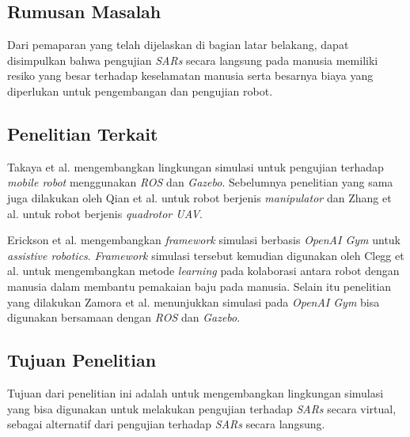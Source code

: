 \subsection{Rumusan Masalah}

Dari pemaparan yang telah dijelaskan di bagian latar belakang, dapat disimpulkan bahwa pengujian \emph{SARs} secara langsung pada manusia memiliki resiko yang besar terhadap keselamatan manusia serta besarnya biaya yang diperlukan untuk pengembangan dan pengujian robot.

\subsection{Penelitian Terkait}

Takaya et al. \citep{Takaya2016} mengembangkan lingkungan simulasi untuk pengujian terhadap \emph{mobile robot} menggunakan \emph{ROS} dan \emph{Gazebo}.
Sebelumnya penelitian yang sama juga dilakukan oleh Qian et al. \citep{Qian2014} untuk robot berjenis \emph{manipulator} dan Zhang et al. \citep{Zhang2015} untuk robot berjenis \emph{quadrotor UAV}.

Erickson et al. \citep{Erickson2020} mengembangkan \emph{framework} simulasi berbasis \emph{OpenAI Gym} \citep{Brockman2016} untuk \emph{assistive robotics}.
\emph{Framework} simulasi tersebut kemudian digunakan oleh Clegg et al. \citep{Clegg2020} untuk mengembangkan metode \emph{learning} pada kolaborasi antara robot dengan manusia dalam membantu pemakaian baju pada manusia.
Selain itu penelitian yang dilakukan Zamora et al. \citep{Zamora2016} menunjukkan simulasi pada \emph{OpenAI Gym} bisa digunakan bersamaan dengan \emph{ROS} dan \emph{Gazebo}.

\subsection{Tujuan Penelitian}

Tujuan dari penelitian ini adalah untuk mengembangkan lingkungan simulasi yang bisa digunakan untuk melakukan pengujian terhadap \emph{SARs} secara virtual, sebagai alternatif dari pengujian terhadap \emph{SARs} secara langsung.